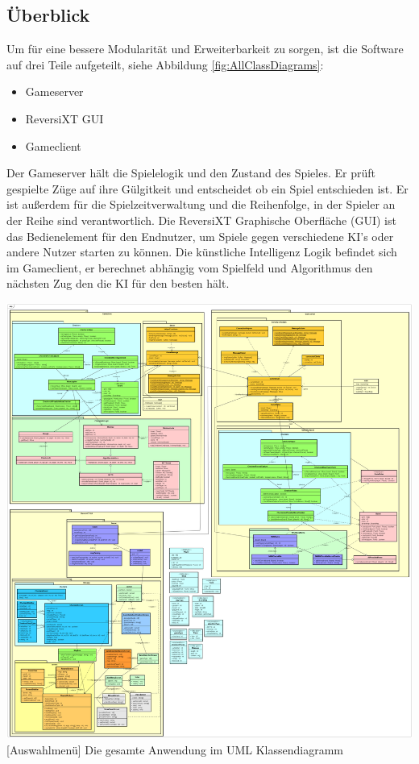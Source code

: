 \documentclass[12pt,a4paper,bibliography=totocnumbered,listof=totocnumbered]{article}
\begin{document}
\subsection{Überblick}
Um für eine bessere Modularität und Erweiterbarkeit zu sorgen, ist die Software auf drei Teile aufgeteilt, siehe Abbildung \ref{fig:AllClassDiagrams}:
\begin{itemize}
    \item Gameserver
    \item ReversiXT GUI
    \item Gameclient
\end{itemize}
Der Gameserver hält die Spielelogik und den Zustand des Spieles. Er prüft gespielte Züge auf ihre Gülgitkeit 
und entscheidet ob ein Spiel entschieden ist. Er ist außerdem für die Spielzeitverwaltung und die Reihenfolge, in 
der Spieler an der Reihe sind verantwortlich. Die ReversiXT Graphische Oberfläche (GUI) ist das Bedienelement für 
den Endnutzer, um Spiele gegen verschiedene KI's oder andere Nutzer starten zu können. 
Die künstliche Intelligenz Logik befindet sich im Gameclient, er berechnet abhängig vom Spielfeld und Algorithmus
den nächsten Zug den die KI für den besten hält.

\vspace{1em}
\begin{minipage}{\linewidth}
	\centering
	\includegraphics[width=1.0\linewidth]{pics/AllClassDiagrams.png}
	[Auswahlmenü]{ Die gesamte Anwendung im UML Klassendiagramm }
	\label{fig:AllClassDiagrams}
\end{minipage}
\end{document}
